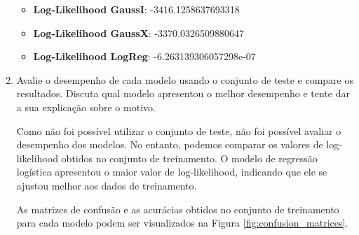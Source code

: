 \begin{enumerate}
\begin{tcolorbox}[title=Resposta:]
        \begin{itemize}
            \item \textbf{Log-Likelihood GaussI}: -3416.1258637693318
            \item \textbf{Log-Likelihood GaussX}: -3370.0326509880647
            \item \textbf{Log-Likelihood LogReg}: -6.263139306057298e-07
        \end{itemize}
    \end{tcolorbox}
    
    \item Avalie o desempenho de cada modelo usando o conjunto de teste e compare os resultados. Discuta qual modelo apresentou o melhor desempenho e tente dar a sua explicação sobre o motivo.
    
    \begin{tcolorbox}[title=Resposta:]
        Como não foi possível utilizar o conjunto de teste, não foi possível avaliar o desempenho dos modelos. No entanto, podemos comparar os valores de log-likelihood obtidos no conjunto de treinamento. O modelo de regressão logística apresentou o maior valor de log-likelihood, indicando que ele se ajustou melhor aos dados de treinamento.

        As matrizes de confusão e as acurácias obtidos no conjunto de treinamento para cada modelo podem ser visualizados na Figura \ref{fig:confusion_matrices}.
    \end{tcolorbox}


\end{enumerate}
